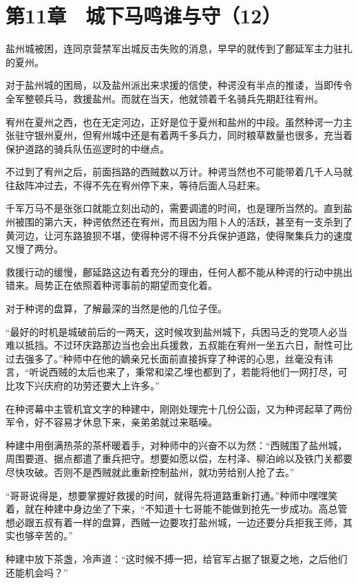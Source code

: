 \section{第11章　城下马鸣谁与守（12）}

盐州城被困，连同京营禁军出城反击失败的消息，早早的就传到了鄜延军主力驻扎的夏州。

对于盐州城的困局，以及盐州派出来求援的信使，种谔没有半点的推诿，当即传令全军整顿兵马，救援盐州。而就在当天，他就领着千名骑兵先期赶往宥州。

宥州在夏州之西，也在无定河边，正好是位于夏州和盐州的中段。虽然种谔一力主张驻守银州夏州，但宥州城中还是有着两千多兵力，同时粮草数量也很多，充当着保护道路的骑兵队伍巡逻时的中继点。

不过到了宥州之后，前面挡路的西贼数以万计。种谔当然也不可能带着几千人马就往敌阵冲过去，不得不先在宥州停下来，等待后面人马赶来。

千军万马不是张张口就能立刻出动的，需要调遣的时间，也是理所当然的。直到盐州被围的第六天，种谔依然还在宥州，而且因为阻卜人的活跃，甚至有一支杀到了黄河边，让河东路狼狈不堪，使得种谔不得不分兵保护道路，使得聚集兵力的速度又慢了两分。

救援行动的缓慢，鄜延路这边有着充分的理由，任何人都不能从种谔的行动中挑出错来。局势正在依照着种谔事前的期望而变化着。

对于种谔的盘算，了解最深的当然是他的几位子侄。

“最好的时机是城破前后的一两天，这时候攻到盐州城下，兵困马乏的党项人必当难以抵挡。不过环庆路那边当也会出兵援救，五叔能在宥州一坐五六日，耐性可比过去强多了。”种师中在他的嫡亲兄长面前直接拆穿了种谔的心思，丝毫没有讳言，“听说西贼的太后也来了，秉常和梁乙埋也都到了，若能将他们一网打尽，可比攻下兴庆府的功劳还要大上许多。”

在种谔幕中主管机宜文字的种建中，刚刚处理完十几份公函，又为种谔起草了两份军令，好不容易才休息下来，亲弟弟就过来聒噪。

种建中用倒满热茶的茶杯暖着手，对种师中的兴奋不以为然：“西贼围了盐州城，周围要道、据点都遣了重兵把守。想要如愿以偿，左村泽、柳泊岭以及铁门关都要尽快攻破。否则不是西贼就此重新控制盐州，就功劳给别人抢了去。”

“哥哥说得是，想要掌握好救援的时间，就得先将道路重新打通。”种师中嘿嘿笑着，就在种建中身边坐了下来，“不知道十七哥能不能做到抢先一步成功。高总管想必跟五叔有着一样的盘算，西贼一边要攻打盐州城，一边还要分兵拒我王师，其实也够辛苦的。”

种建中放下茶盏，冷声道：“这时候不搏一把，给官军占据了银夏之地，之后他们还能机会吗？”

